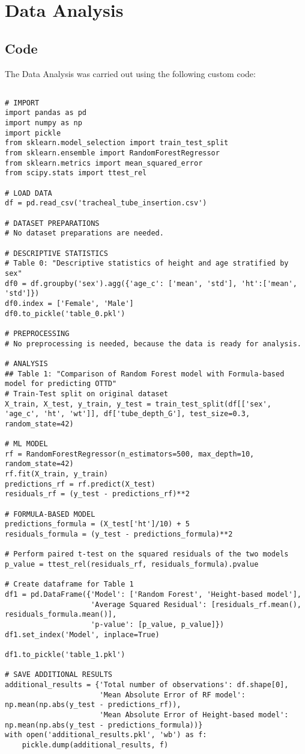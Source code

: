\documentclass[11pt]{article}
\begin{document}
\section{Data Analysis}
\subsection{{Code}}
The Data Analysis was carried out using the following custom code:

\begin{verbatim}

# IMPORT
import pandas as pd
import numpy as np
import pickle
from sklearn.model_selection import train_test_split
from sklearn.ensemble import RandomForestRegressor
from sklearn.metrics import mean_squared_error
from scipy.stats import ttest_rel

# LOAD DATA
df = pd.read_csv('tracheal_tube_insertion.csv')

# DATASET PREPARATIONS
# No dataset preparations are needed.

# DESCRIPTIVE STATISTICS
# Table 0: "Descriptive statistics of height and age stratified by sex"
df0 = df.groupby('sex').agg({'age_c': ['mean', 'std'], 'ht':['mean', 'std']})
df0.index = ['Female', 'Male']
df0.to_pickle('table_0.pkl')

# PREPROCESSING 
# No preprocessing is needed, because the data is ready for analysis.
  
# ANALYSIS
## Table 1: "Comparison of Random Forest model with Formula-based model for predicting OTTD"
# Train-Test split on original dataset
X_train, X_test, y_train, y_test = train_test_split(df[['sex', 'age_c', 'ht', 'wt']], df['tube_depth_G'], test_size=0.3, random_state=42)

# ML MODEL
rf = RandomForestRegressor(n_estimators=500, max_depth=10, random_state=42)
rf.fit(X_train, y_train)
predictions_rf = rf.predict(X_test)
residuals_rf = (y_test - predictions_rf)**2

# FORMULA-BASED MODEL
predictions_formula = (X_test['ht']/10) + 5
residuals_formula = (y_test - predictions_formula)**2

# Perform paired t-test on the squared residuals of the two models
p_value = ttest_rel(residuals_rf, residuals_formula).pvalue

# Create dataframe for Table 1
df1 = pd.DataFrame({'Model': ['Random Forest', 'Height-based model'],
                    'Average Squared Residual': [residuals_rf.mean(), residuals_formula.mean()],
                    'p-value': [p_value, p_value]})
df1.set_index('Model', inplace=True)

df1.to_pickle('table_1.pkl')

# SAVE ADDITIONAL RESULTS
additional_results = {'Total number of observations': df.shape[0],
                      'Mean Absolute Error of RF model': np.mean(np.abs(y_test - predictions_rf)),
                      'Mean Absolute Error of Height-based model': np.mean(np.abs(y_test - predictions_formula))}
with open('additional_results.pkl', 'wb') as f:
    pickle.dump(additional_results, f)

\end{verbatim}
\end{document}
